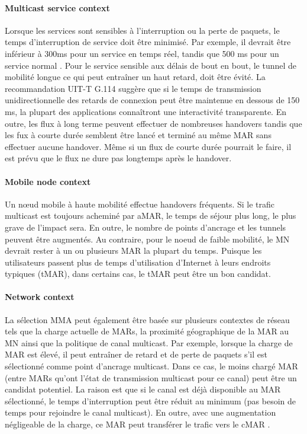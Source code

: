 \paragraph{Multicast service context}
Lorsque les services sont sensibles à l'interruption ou la perte de paquets, le temps d'interruption de service doit être minimisé. Par exemple, il devrait être inférieur à 300ms pour un service en temps réel, tandis que 500 ms pour un service normal \cite{interruption_requirements}. Pour le service sensible aux délais de bout en bout, le tunnel de mobilité longue ce qui peut entraîner un haut retard, doit être évité. La recommandation UIT-T G.114 \cite{itu-t} suggère que si le temps de transmission unidirectionnelle des retards de connexion peut être maintenue en dessous de 150 ms, la plupart des applications connaîtront une interactivité transparente. En outre, les flux à long terme peuvent effectuer de nombreuses handovers tandis que les fux à courte durée semblent être lancé et terminé au même MAR sans effectuer aucune handover. Même si un flux de courte durée pourrait le faire, il est prévu que le flux ne dure pas longtemps après le handover.

\paragraph{Mobile node context}
Un nœud mobile à haute mobilité effectue handovers fréquents. Si le trafic multicast est toujours acheminé par aMAR, le temps de séjour plus long, le plus grave de l'impact sera. En outre, le nombre de points d'ancrage et les tunnels peuvent être augmentés. Au contraire, pour le noeud de faible mobilité, le MN devrait rester à un ou plusieurs MAR la plupart du temps. Puisque les utilisateurs passent plus de temps d'utilisation d'Internet à leurs endroits typiques (tMAR), dans certains cas, le tMAR peut être un bon candidat.

\paragraph{Network context}
La sélection MMA peut également être basée sur plusieurs contextes de réseau tels que la charge actuelle de MARs, la proximité géographique de la MAR au MN ainsi que la politique de canal multicast. Par exemple, lorsque la charge de MAR est élevé, il peut entraîner de retard et de perte de paquets s'il est sélectionné comme point d'ancrage multicast. Dans ce cas, le moins chargé MAR (entre MARs qu'ont l'état de transmission multicast pour ce canal) peut être un candidat potentiel. La raison est  que si le canal est déjà disponible au MAR sélectionné, le temps d'interruption peut être réduit au minimum (pas besoin de temps pour rejoindre le canal multicast). En outre, avec une augmentation négligeable de la charge, ce MAR peut transférer le trafic vers le cMAR \cite{developing_ip_multicast}.

